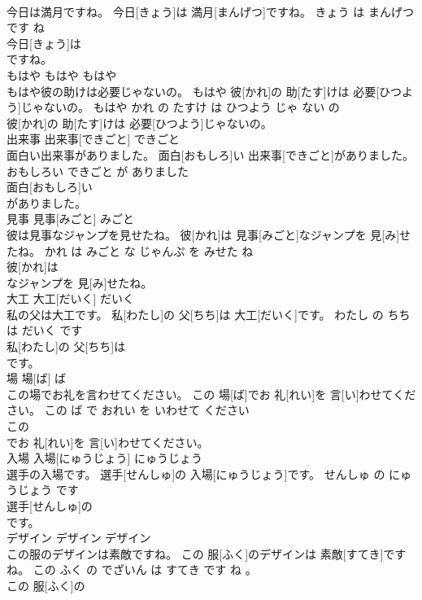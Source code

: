 \documentclass[8pt]{extreport}
\begin{document}
\begin{CJK}{UTF8}{min}
\\	今日は満月ですね。	今日[きょう]は 満月[まんげつ]ですね。	きょう は まんげつ です ね	
\\	今日[きょう]は
\\	ですね。			
\\	もはや	もはや	もはや	
\\	もはや彼の助けは必要じゃないの。	もはや 彼[かれ]の 助[たす]けは 必要[ひつよう]じゃないの。	もはや かれ の たすけ は ひつよう じゃ ない の	
\\	彼[かれ]の 助[たす]けは 必要[ひつよう]じゃないの。			
\\	出来事	出来事[できごと]	できごと	
\\	面白い出来事がありました。	面白[おもしろ]い 出来事[できごと]がありました。	おもしろい できごと が ありました	
\\	面白[おもしろ]い
\\	がありました。			
\\	見事	見事[みごと]	みごと	
\\	彼は見事なジャンプを見せたね。	彼[かれ]は 見事[みごと]なジャンプを 見[み]せたね。	かれ は みごと な じゃんぷ を みせた ね	
\\	彼[かれ]は
\\	なジャンプを 見[み]せたね。			
\\	大工	大工[だいく]	だいく	
\\	私の父は大工です。	私[わたし]の 父[ちち]は 大工[だいく]です。	わたし の ちち は だいく です	
\\	私[わたし]の 父[ちち]は
\\	です。			
\\	場	場[ば]	ば	
\\	この場でお礼を言わせてください。	この 場[ば]でお 礼[れい]を 言[い]わせてください。	この ば で おれい を いわせて ください	
\\	この
\\	でお 礼[れい]を 言[い]わせてください。			
\\	入場	入場[にゅうじょう]	にゅうじょう	
\\	選手の入場です。	選手[せんしゅ]の 入場[にゅうじょう]です。	せんしゅ の にゅうじょう です	
\\	選手[せんしゅ]の
\\	です。			
\\	デザイン	デザイン	デザイン	
\\	この服のデザインは素敵ですね。	この 服[ふく]のデザインは 素敵[すてき]ですね。	この ふく の でざいん は すてき です ね 。	
\\	この 服[ふく]の

\end{CJK}
\end{document}
